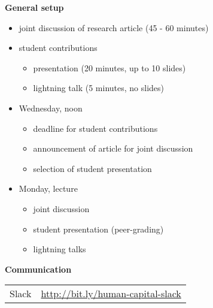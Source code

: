 \begin{frame}\textbf{General setup}\vspace{0.5cm}

\begin{itemize}\setlength\itemsep{1em}
\item joint discussion of research article (45 - 60 minutes)
\item student contributions\medskip
\begin{itemize}\setlength\itemsep{1em}
  \item presentation (20 minutes, up to 10 slides)
  \item lightning talk (5 minutes, no slides)
\end{itemize}
\end{itemize}

\end{frame}
\begin{frame}

\begin{itemize}\setlength\itemsep{1em}
  \item Wednesday, noon\medskip
  \begin{itemize}\setlength\itemsep{1em}
    \item deadline for student contributions
    \item announcement of article for joint discussion
    \item selection of student presentation
  \end{itemize}
  \item Monday, lecture\medskip
  \begin{itemize}\setlength\itemsep{1em}
    \item joint discussion
    \item student presentation (peer-grading)
    \item lightning talks
  \end{itemize}
\end{itemize}
\end{frame}
\begin{frame}
\textbf{Communication}\\\vspace{0.5cm}
\begin{tabular}{ll}
Slack     & \url{http://bit.ly/human-capital-slack} \\
\end{tabular}
\end{frame}
